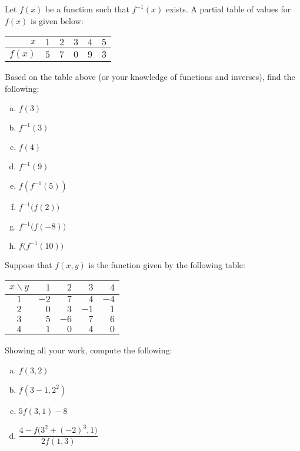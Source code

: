\documentclass[11pt,letterpaper]{article}
\begin{document}
\prob Let $f(x)$ be a function such that $f^{-1}(x)$ exists. A partial table of values for $f(x)$ is given below: \par
	\begin{table}[H]
	\centering
	\begin{tabular}{|r||c|c|c|c|c|} \hline 
	$x$ & $1$ & $2$ & $3$ & $4$ & $5$ \\ \hline
	$f(x)$ & $5$ & $7$ & $0$ & $9$ & $3$ \\ \hline
	\end{tabular}
	\end{table}
Based on the table above (or your knowledge of functions and inverses), find the following:
	\begin{enumerate}[(a)]
	\item $f(3)$
	\item $f^{-1}(3)$
	\item $f(4)$
	\item $f^{-1}(9)$
	\item $f(f^{-1}(5))$
	\item $f^{-1} \big( f(2) \big)$
	\item $f^{-1} \big( f(-8) \big)$
	\item $f \big( f^{-1}(10) \big)$
	\end{enumerate} \pspace


\prob Suppose that $f(x, y)$ is the function given by the following table:
	\begin{table}[H]
	\centering
	\begin{tabular}{|c||r|r|r|r|} \hline 
	$x \backslash y$ & $1$ & $2$ & $3$ & $4$ \\ \hline \hline
	$1$ & $-2$ & $7$ & $4$ & $-4$ \\ \hline
	$2$ & $0$ & $3$ & $-1$ & $1$ \\ \hline
	$3$ & $5$ & $-6$ & $7$ & $6$ \\ \hline
	$4$ & $1$ & $0$ & $4$ & $0$ \\ \hline
	\end{tabular}
	\end{table} \par
Showing all your work, compute the following:
	\begin{enumerate}[(a)]
	\item $f(3, 2)$
	\item $f(3 - 1, 2^2)$
	\item $5 f(3, 1) - 8$
	\item $\dfrac{4 - f\big( 3^2 + (-2)^3, 1 \big) }{2 f(1, 3)}$
	\end{enumerate} \pspace
\end{document}

